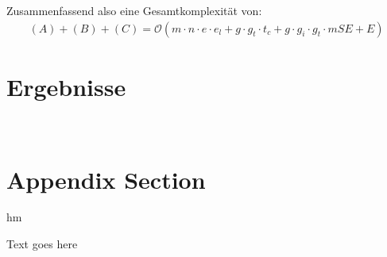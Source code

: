 \documentclass[12pt]{article}
\begin{document}
Zusammenfassend also eine Gesamtkomplexität von:
\begin{align*}
    (A) + (B) + (C) = \mathcal{O}( m \cdot n \cdot e \cdot e_{l}+ g \cdot g_{t} \cdot t_{c} + g \cdot g_{i} \cdot g_{t} \cdot mSE + E)
\end{align*}
    


\section{Ergebnisse}










\newpage~\appendix

\section{Appendix Section}

hm 

Text goes here
\end{document}
